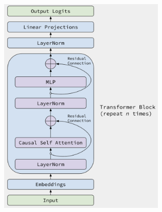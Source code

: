 \documentclass[11pt]{article}
\begin{document}
\begin{center}
\includegraphics[width=0.6\textwidth, keepaspectratio]{inserted_images/model_arch.png}
\end{center}
\end{document}

